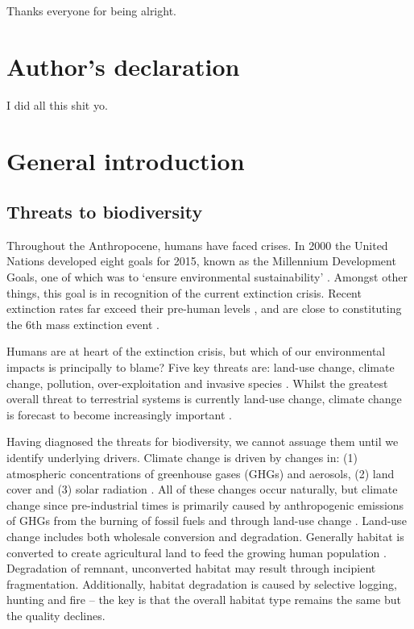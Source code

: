 \documentclass[12pt,a4paper,]{report}
\theoremstyle{definition}
\theoremstyle{definition}
\theoremstyle{definition}
\theoremstyle{remark}
\begin{document}
Thanks everyone for being alright.

\pagebreak

\chapter*{Author's declaration}\label{authors-declaration}

I did all this shit yo.

\pagebreak

\pagestyle{fancyplain} \fancyhf{}
\fancyhead[R]{\nouppercase\chaptername \space \thechapter}
\fancyfoot[R]{\thepage} 

\chapter{General introduction}\label{general-introduction}

\section{Threats to biodiversity}\label{threats-to-biodiversity}

Throughout the Anthropocene, humans have faced crises. In 2000 the
United Nations developed eight goals for 2015, known as the Millennium
Development Goals, one of which was to `ensure environmental
sustainability' \citep{united_nations_united2014}. Amongst other things,
this goal is in recognition of the current extinction crisis. Recent
extinction rates far exceed their pre-human levels
\citep{pimm_future1995}, and are close to constituting the 6th mass
extinction event \citep{barnosky_has2011}.

Humans are at heart of the extinction crisis, but which of our
environmental impacts is principally to blame? Five key threats are:
land-use change, climate change, pollution, over-exploitation and
invasive species \citep{hirsch_global2010}. Whilst the greatest overall
threat to terrestrial systems is currently land-use change, climate
change is forecast to become increasingly important
\citep{sala_global2000}.

Having diagnosed the threats for biodiversity, we cannot assuage them
until we identify underlying drivers. Climate change is driven by
changes in: (1) atmospheric concentrations of greenhouse gases (GHGs)
and aerosols, (2) land cover and (3) solar radiation \citep{ipcc2013}.
All of these changes occur naturally, but climate change since
pre-industrial times is primarily caused by anthropogenic emissions of
GHGs from the burning of fossil fuels and through land-use change
\citep{ipcc2013}. Land-use change includes both wholesale conversion and
degradation. Generally habitat is converted to create agricultural land
to feed the growing human population
\citep{foley_solutions2011, godfray_food2010}. Degradation of remnant,
unconverted habitat may result through incipient fragmentation.
Additionally, habitat degradation is caused by selective logging,
hunting and fire -- the key is that the overall habitat type remains the
same but the quality declines.
\end{document}
